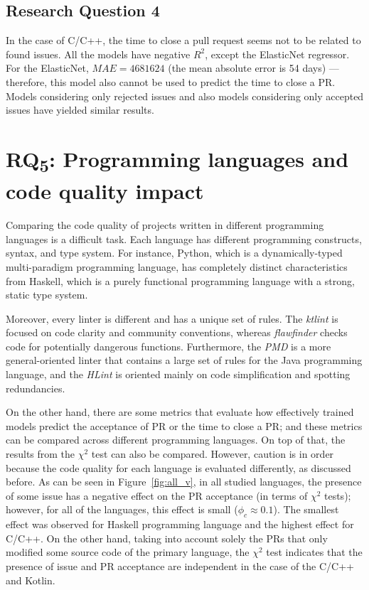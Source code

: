 \documentclass[digital,oneside,oldtable,nolof,nolot,nocover]{fithesis4}
\begin{document}
\subsection{Research Question 4}
\label{sec:org3dd3950}
In the case of C/C++, the time to close a pull request seems not to be related
to found issues.  All the models have negative \(R^2\), except the ElasticNet
regressor. For the ElasticNet, \(MAE = 4681624\) (the mean absolute error is 54
days) --- therefore, this model also cannot be used to predict the time to
close a PR.  Models considering only rejected issues and also models
considering only accepted issues have yielded similar results.
\FloatBarrier
\section{RQ\textsubscript{5}: Programming languages and code quality impact}
\label{sec:org8aa8401}
Comparing the code quality of projects written in different programming
languages is a difficult task.  Each language has different programming
constructs, syntax, and type system. For instance, Python, which is
a dynamically-typed multi-paradigm programming language, has completely
distinct characteristics from Haskell, which is a purely functional programming
language with a strong, static type system.

Moreover, every linter is different and has a unique set of rules.  The
\emph{ktlint} is focused on code clarity and community conventions, whereas
\emph{flawfinder} checks code for potentially dangerous functions. Furthermore,
the \emph{PMD} is a more general-oriented linter that contains a large set of
rules for the Java programming language, and the \emph{HLint} is oriented mainly
on code simplification and spotting redundancies.

On the other hand, there are some metrics that evaluate how effectively
trained models predict the acceptance of PR or the time to close a PR;
and these metrics can be compared across different programming languages.
On top of that, the results from the \(\chi^2\) test can also be compared.
However, caution is in order because the code quality for each language is
evaluated differently, as discussed before.
As can be seen in Figure~\ref{fig:all_v}, in all studied languages, the
presence of some issue has a negative effect on the PR acceptance (in terms
of \(\chi^2\) tests); however, for all of the languages, this effect is small (\(\phi_c
   \approx 0.1\)).  The smallest effect was observed for Haskell programming
language and the highest effect for C/C++.  On the other hand,
taking into account solely the PRs that only modified some source code of the
primary language, the \(\chi^2\) test indicates that the presence of issue and PR
acceptance are independent in the case of the C/C++ and Kotlin.
\end{document}

